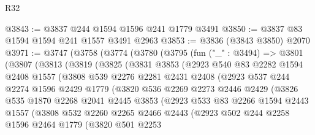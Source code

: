 \begin{lexlean}{R32}
\begin{coremodule}
@3843 := @3837 @244 @1594 @1596 @241 @1779 @3491
@3850 := @3837 @83 @1594 @1594 @241 @1557 @3491 @2963
@3853 := @3836 (@3843 @3850) @2070
@3971 := @3747
    (@3758
      (@3774
        (@3780
          (@3795
            (fun ("_" : @3494) =>
            @3801
              (@3807
                (@3813
                  (@3819
                    (@3825
                      (@3831
                        @3853
                        (@2923
                          @540
                          @83
                          @2282
                          @1594
                          @2408
                          @1557
                          (@3808
                            @539
                            @2276
                            @2281
                            @2431
                            @2408
                            (@2923
                              @537
                              @244
                              @2274
                              @1596
                              @2429
                              @1779
                              (@3820
                                @536
                                @2269
                                @2273
                                @2446
                                @2429
                                (@3826
                                  @535
                                  @1870
                                  @2268
                                  @2041
                                  @2445
                                  @3853
                                  (@2923
                                    @533
                                    @83
                                    @2266
                                    @1594
                                    @2443
                                    @1557
                                    (@3808
                                      @532
                                      @2260
                                      @2265
                                      @2466
                                      @2443
                                      (@2923
                                        @502
                                        @244
                                        @2258
                                        @1596
                                        @2464
                                        @1779
                                        (@3820
                                          @501
                                          @2253

\end{coremodule}
\end{lexlean}
